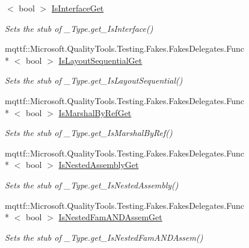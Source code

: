 \begin{DoxyCompactItemize}
$<$ bool $>$ \hyperlink{class_system_1_1_runtime_1_1_interop_services_1_1_fakes_1_1_stub___type_a3bdce84429412e8be9257c444a0fb007}{Is\-Interface\-Get}
\begin{DoxyCompactList}\small\item\em Sets the stub of \-\_\-\-Type.\-get\-\_\-\-Is\-Interface()\end{DoxyCompactList}\item 
mqttf\-::\-Microsoft.\-Quality\-Tools.\-Testing.\-Fakes.\-Fakes\-Delegates.\-Func\\*
$<$ bool $>$ \hyperlink{class_system_1_1_runtime_1_1_interop_services_1_1_fakes_1_1_stub___type_a0be08e82b891d93232203e551f41d3d5}{Is\-Layout\-Sequential\-Get}
\begin{DoxyCompactList}\small\item\em Sets the stub of \-\_\-\-Type.\-get\-\_\-\-Is\-Layout\-Sequential()\end{DoxyCompactList}\item 
mqttf\-::\-Microsoft.\-Quality\-Tools.\-Testing.\-Fakes.\-Fakes\-Delegates.\-Func\\*
$<$ bool $>$ \hyperlink{class_system_1_1_runtime_1_1_interop_services_1_1_fakes_1_1_stub___type_ab6c43eaaaddecd63a9a10559fa72de4b}{Is\-Marshal\-By\-Ref\-Get}
\begin{DoxyCompactList}\small\item\em Sets the stub of \-\_\-\-Type.\-get\-\_\-\-Is\-Marshal\-By\-Ref()\end{DoxyCompactList}\item 
mqttf\-::\-Microsoft.\-Quality\-Tools.\-Testing.\-Fakes.\-Fakes\-Delegates.\-Func\\*
$<$ bool $>$ \hyperlink{class_system_1_1_runtime_1_1_interop_services_1_1_fakes_1_1_stub___type_a5c7ad070b33dbe00362fd65c494221ce}{Is\-Nested\-Assembly\-Get}
\begin{DoxyCompactList}\small\item\em Sets the stub of \-\_\-\-Type.\-get\-\_\-\-Is\-Nested\-Assembly()\end{DoxyCompactList}\item 
mqttf\-::\-Microsoft.\-Quality\-Tools.\-Testing.\-Fakes.\-Fakes\-Delegates.\-Func\\*
$<$ bool $>$ \hyperlink{class_system_1_1_runtime_1_1_interop_services_1_1_fakes_1_1_stub___type_a0ce4e29befb39b8030e8440eab024e3f}{Is\-Nested\-Fam\-A\-N\-D\-Assem\-Get}
\begin{DoxyCompactList}\small\item\em Sets the stub of \-\_\-\-Type.\-get\-\_\-\-Is\-Nested\-Fam\-A\-N\-D\-Assem()\end{DoxyCompactList}\item 

\end{DoxyCompactItemize}
